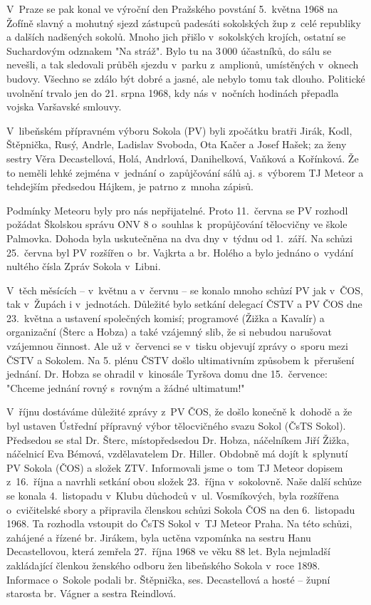 \documentclass[a5paper, 11pt, twoside]{article}
\begin{document}
V~Praze se pak konal ve výroční den Pražského povstání 5.~května 1968 na
Žofíně slavný a mohutný sjezd zástupců padesáti sokolských žup z~celé
republiky a dalších nadšených sokolů. Mnoho jich přišlo v~sokolských
krojích, ostatní se Suchardovým odznakem "Na stráž". Bylo tu na 3\,000
účastníků, do sálu se nevešli, a tak sledovali průběh sjezdu v~parku
z~amplionů, umístěných v~oknech budovy. Všechno se zdálo být dobré a
jasné, ale nebylo tomu tak dlouho. Politické uvolnění trvalo jen do 21.
srpna 1968, kdy nás v~nočních hodinách přepadla vojska Varšavské
smlouvy.

V~libeňském přípravném výboru Sokola (PV) byli zpočátku bratři Jirák,
Kodl, Štěpnička, Rusý, Andrle, Ladislav Svoboda, Ota Kačer a Josef
Hašek; za ženy sestry Věra Decastellová, Holá, Andrlová, Danihelková,
Vaňková a Kořínková. Že to neměli lehké zejména v~jednání o~zapůjčování
sálů aj. s~výborem TJ Meteor a tehdejším předsedou Hájkem, je patrno
z~mnoha zápisů.

Podmínky Meteoru byly pro nás nepřijatelné. Proto 11.~června se PV
rozhodl požádat Školskou správu ONV 8 o~souhlas k~propůjčování
tělocvičny ve škole Palmovka. Dohoda byla uskutečněna na dva dny v~týdnu
od 1.~září. Na schůzi 25.~června byl PV rozšířen o~br. Vajkrta a br.
Holého a bylo jednáno o~vydání nultého čísla Zpráv Sokola v~Libni.

V~těch měsících -- v~květnu a v~červnu -- se konalo mnoho schůzí PV jak
v~ČOS, tak v~Župách i v~jednotách. Důležité bylo setkání delegací ČSTV a
PV ČOS dne 23.~května a ustavení společných komisí; programové (Žižka a
Kavalír) a organizační (Šterc a Hobza) a také vzájemný slib, že si
nebudou narušovat vzájemnou činnost. Ale už v~červenci se v~tisku
objevují zprávy o~sporu mezi ČSTV a Sokolem. Na 5. plénu ČSTV došlo
ultimativním způsobem k~přerušení jednání. Dr. Hobza se ohradil
v~kinosále Tyršova domu dne 15.~července: "Chceme jednání rovný s~rovným a
žádné ultimatum!"

V~říjnu dostáváme důležité zprávy z~PV ČOS, že došlo konečně k~dohodě a
že byl ustaven Ústřední přípravný výbor tělocvičného svazu Sokol (ČsTS
Sokol). Předsedou se stal Dr. Šterc, místopředsedou Dr. Hobza,
náčelníkem Jiří Žižka, náčelnicí Eva Bémová, vzdělavatelem Dr. Hiller.
Obdobně má dojít k~splynutí PV Sokola (ČOS) a složek ZTV. Informovali
jsme o~tom TJ Meteor dopisem z~16.~října a navrhli setkání obou složek
23.~října v~sokolovně. Naše další schůze se konala 4.~listopadu v~Klubu
důchodců v~ul. Vosmíkových, byla rozšířena o~cvičitelské sbory a
připravila členskou schůzi Sokola ČOS na den 6.~listopadu 1968. Ta
rozhodla vstoupit do ČsTS Sokol v~TJ Meteor Praha. Na této schůzi,
zahájené a řízené br. Jirákem, byla uctěna vzpomínka na sestru Hanu
Decastellovou, která zemřela 27.~října 1968 ve věku 88 let. Byla
nejmladší zakládající členkou ženského odboru žen libeňského Sokola
v~roce 1898. Informace o~Sokole podali br. Štěpnička, ses. Decastellová a
hosté -- župní starosta br. Vágner a sestra Reindlová.
\end{document}
